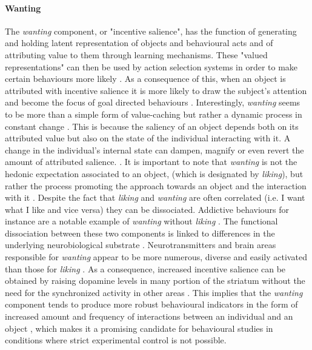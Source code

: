 \paragraph*{Wanting}
\label{wanting}
The \emph{wanting} component, or "incentive salience", has the function of generating and holding latent representation of objects and behavioural acts and of attributing value to them through learning mechanisms. These "valued representations" can then be used by action selection systems in order to make certain behaviours more likely \cite{ikemoto1996dissociations,berridge1998role,mcclure2003computational,berridge2004motivation}. As a consequence of this, when an object is attributed with incentive salience it is more likely to draw the subject's attention and become the focus of goal directed behaviours \cite{berridge2004motivation}. Interestingly, \emph{wanting} seems to be more than a simple form of value-caching but rather a dynamic process in constant change \cite{robinson1993neural,zhang2009neural,tindell2009dynamic,berridge2012prediction}. This is because the saliency of an object depends both on its attributed value but also on the state of the individual interacting with it. A change in the individual's internal state can dampen, magnify or even revert the amount of attributed salience. \cite{robinson1993neural,zhang2009neural,tindell2009dynamic,berridge2012prediction}. It is important to note that \emph{wanting} is not the hedonic expectation associated to an object, (which is designated by \emph{liking}), but rather the process promoting the approach towards an object and the interaction with it \cite{berridge2009dissecting,robinson2015roles}. Despite the fact that \emph{liking} and \emph{wanting} are often correlated (i.e. I want what I like and vice versa) they can be dissociated. Addictive behaviours for instance are a notable example of \emph{wanting} without \emph{liking} \cite{robinson1993neural}. The functional dissociation between these two components is linked to differences in the underlying neurobiological substrate \cite{berridge2009dissecting,smith2011disentangling}. Neurotransmitters and brain areas responsible for \emph{wanting} appear to be more numerous, diverse and easily activated than those for \emph{liking} \cite{berridge2009dissecting,robinson2015roles}. As a consequence, increased incentive salience can be obtained by raising dopamine levels in many portion of the striatum without the need for the synchronized activity in other areas \cite{berridge2009dissecting,smith2011disentangling,meyer2015motivational}. This implies that the \emph{wanting} component tends to produce more robust behavioural indicators in the form of increased amount and frequency of interactions between an individual and an object \cite{berridge1998role}, which makes it a promising candidate for behavioural studies in conditions where strict experimental control is not possible.

